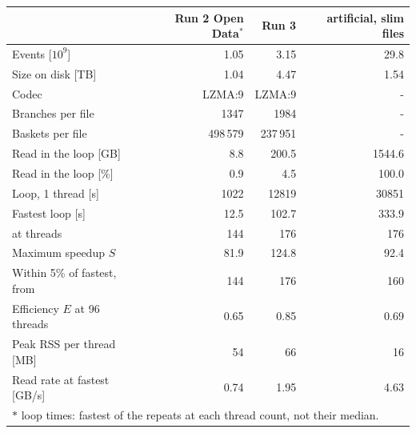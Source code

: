\begin{tabular}{lrrr}
\toprule
 & Run 2 Open Data$^*$ & Run 3 & artificial, slim files \\
\midrule
Events [$10^9$] & 1.05 & 3.15 & 29.8 \\
Size on disk [TB] & 1.04 & 4.47 & 1.54 \\
Codec & LZMA:9 & LZMA:9 & - \\
Branches per file & 1347 & 1984 & - \\
Baskets per file & 498\,579 & 237\,951 & - \\
Read in the loop [GB] & 8.8 & 200.5 & 1544.6 \\
Read in the loop [\%] & 0.9 & 4.5 & 100.0 \\
Loop, 1 thread [s] & 1022 & 12819 & 30851 \\
Fastest loop [s] & 12.5 & 102.7 & 333.9 \\
at threads & 144 & 176 & 176 \\
Maximum speedup $S$ & 81.9 & 124.8 & 92.4 \\
Within 5\% of fastest, from & 144 & 176 & 160 \\
Efficiency $E$ at 96 threads & 0.65 & 0.85 & 0.69 \\
Peak RSS per thread [MB] & 54 & 66 & 16 \\
Read rate at fastest [GB/s] & 0.74 & 1.95 & 4.63 \\
\bottomrule
\multicolumn{4}{l}{\footnotesize $*$ loop times: fastest of the repeats at each thread count, not their median.} \\
\end{tabular}
